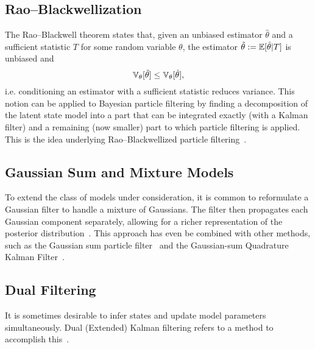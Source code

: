 \subsection{Rao--Blackwellization}  
The Rao--Blackwell theorem states that, given an unbiased estimator $\hat\theta$ and a sufficient statistic $T$ for some random variable $\theta$, the estimator $\tilde\theta:= \operatorname{\mathbb{E}}[\hat\theta|T]$ is unbiased and~\cite{Cas01}
\[
\operatorname{\mathbb{V}}_\theta[\tilde\theta]\leq \operatorname{\mathbb{V}}_\theta[\hat\theta],
\]
i.e. conditioning an estimator with a sufficient statistic reduces variance.  This notion can be applied to Bayesian particle filtering by finding a decomposition of the latent state  model into a part that can be integrated exactly (with a Kalman filter) and a remaining (now smaller) part to which particle filtering is applied.  This is the idea underlying Rao--Blackwellized particle filtering~\cite{Dou00,Dou00b}.

\subsection{Gaussian Sum and Mixture Models} 
To extend the class of models under consideration, it is common to reformulate a Gaussian filter to handle a mixture of Gaussians.  The filter then propagates each Gaussian component separately, allowing for a richer representation of the posterior distribution~\cite{Sor71,Als72,Tam99, Che00,Ter11}.  This approach has even be combined with other methods, such as the Gaussian sum particle filter~\cite{Kot03} and the Gaussian-sum Quadrature Kalman Filter~\cite{Ara07}.

\subsection{Dual Filtering}
It is sometimes desirable to infer states and update model parameters simultaneously.  Dual (Extended) Kalman filtering refers to a method to accomplish this~\cite{Nel97,Wan97,Wan00b}.


